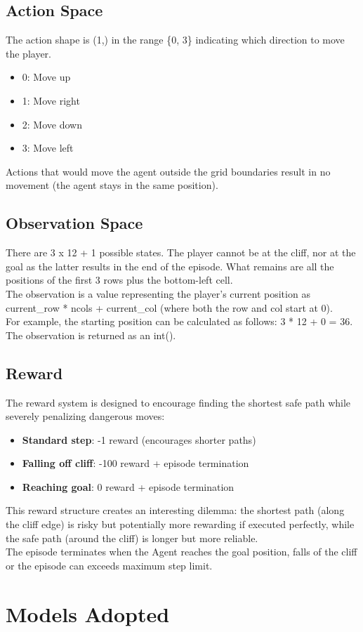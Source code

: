 \documentclass[a4paper,12pt]{article}
\begin{document}
\subsection{Action Space}
The action shape is (1,) in the range \{0, 3\} indicating which direction to move the player.
\begin{itemize}
    \item 0: Move up
    \item 1: Move right
    \item 2: Move down
    \item 3: Move left
\end{itemize}
Actions that would move the agent outside the grid boundaries result in no movement (the agent stays in the same position).
\subsection{Observation Space}
There are 3 x 12 + 1 possible states. The player cannot be at the cliff, nor at the goal as the latter results in the end of the episode. What remains are all the positions of the first 3 rows plus the bottom-left cell.
\vspace{0,5cm}\\
The observation is a value representing the player’s current position as current\_row * ncols + current\_col (where both the row and col start at 0).\\For example, the starting position can be calculated as follows: 3 * 12 + 0 = 36.
\vspace{0,5cm}\\
The observation is returned as an int().
\subsection{Reward}
The reward system is designed to encourage finding the shortest safe path while severely penalizing dangerous moves:
\begin{itemize}
    \item \textbf{Standard step}: -1 reward (encourages shorter paths)
    \item \textbf{Falling off cliff}: -100 reward + episode termination
    \item \textbf{Reaching goal}: 0 reward + episode termination
\end{itemize}
This reward structure creates an interesting dilemma: the shortest path (along the cliff edge) is risky but potentially more rewarding if executed perfectly, while the safe path (around the cliff) is longer but more reliable.
\vspace{0,5cm}\\
The episode terminates when the Agent reaches the goal position, falls of the cliff or the episode can exceeds maximum step limit.
\section{Models Adopted}
\end{document}
